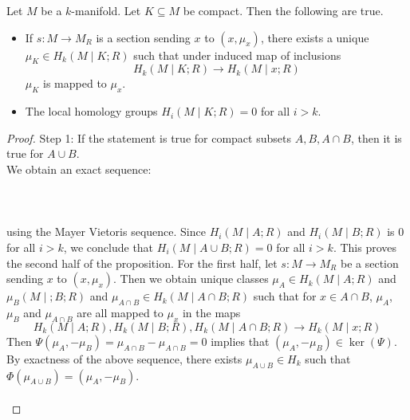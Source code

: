\documentclass[a4paper]{article}
\begin{document}
\begin{prp}{}{} Let $M$ be a $k$-manifold. Let $K\subseteq M$ be compact. Then the following are true. 
\begin{itemize}
\item If $s:M\to M_R$ is a section sending $x$ to $(x,\mu_x)$, there exists a unique $\mu_K\in H_k(M\;|\;K;R)$ such that under induced map of inclusions $$H_k(M\;|\;K;R)\to H_k(M\;|\;x;R)$$ $\mu_K$ is mapped to $\mu_x$. 
\item The local homology groups $H_i(M\;|\;K;R)=0$ for all $i>k$. 
\end{itemize} \tcbline
\begin{proof}
Step 1: If the statement is true for compact subsets $A,B,A\cap B$, then it is true for $A\cup B$. \\
We obtain an exact sequence: \\~\\
\\~\\
using the Mayer Vietoris sequence. Since $H_i(M\;|\;A;R)$ and $H_i(M\;|\;B;R)$ is $0$ for all $i>k$, we conclude that $H_i(M\;|\;A\cup B;R)=0$ for all $i>k$. This proves the second half of the proposition. For the first half, let $s:M\to M_R$ be a section sending $x$ to $(x,\mu_x)$. Then we obtain unique classes $\mu_A\in H_k(M\;|\;A;R)$ and $\mu_B(M\;|\;;B;R)$ and $\mu_{A\cap B}\in H_k(M\;|\;A\cap B;R)$ such that for $x\in A\cap B$, $\mu_A$, $\mu_B$ and $\mu_{A\cap B}$ are all mapped to $\mu_x$ in the maps $$H_k(M\;|\;A;R),H_k(M\;|\;B;R),H_k(M\;|\;A\cap B;R)\to H_k(M\;|\;x;R)$$ Then $\Psi(\mu_A,-\mu_B)=\mu_{A\cap B}-\mu_{A\cap B}=0$ implies that $(\mu_A,-\mu_B)\in\ker(\Psi)$. By exactness of the above sequence, there exists $\mu_{A\cup B}\in H_k$ such that $\Phi(\mu_{A\cup B})=(\mu_A,-\mu_B)$. \\~\\


\end{proof}
\end{prp}
\end{document}

